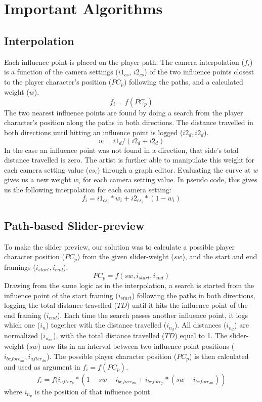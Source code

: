\section{Important Algorithms}
\subsection{Interpolation}

Each influence point is placed on the player path. The camera interpolation ($f_{i}$) is a function of the camera settings ($i1_{cs}$, $i2_{cs}$) of the two influence points closest to the player character's position ($PC_{p}$) following the paths, and a calculated weight ($w$).
\begin{equation}
f_{i} = f(PC_{p})
\end{equation}
The two nearest influence points are found by doing a search from the player character's position along the paths in both directions. The distance travelled in both directions until hitting an influence point is logged ($i2_{d}, i2_{d}$).
\begin{equation}
w = i1_{d}/(i2_{d} + i2_{d})
\end{equation}
In the case an influence point was not found in a direction, that side's total distance travelled is zero. The artist is further able to manipulate this weight for each camera setting value ($cs_{i}$) through a graph editor. Evaluating the curve at $w$ gives us a new weight $w_{i}$ for each camera setting value. In pseudo code, this gives us the following interpolation for each camera setting:
\begin{equation}
f_{i} = i1_{cs_{i}} * w_{i} + i2_{cs_{i}} * (1-w_{i})
\end{equation}
\subsection{Path-based Slider-preview}
To make the slider preview, our solution was to calculate a possible player character position ($PC_{p}$) from the given slider-weight ($sw$), and the start and end framings ($i_{start}, i_{end}$).
\begin{equation}
PC_{p} = f(sw, i_{start}, i_{end})
\end{equation}
Drawing from the same logic as in the interpolation, a search is started from the influence point of the start framing ($i_{start}$) following the paths in both directions, logging the total distance travelled ($TD$) until it hits the influence point of the end framing ($i_{end}$). Each time the search passes another influence point, it logs which one ($i_{n}$) together with the distance travelled ($i_{n_{d}}$). All distances ($i_{n_{d}}$) are normalized ($i_{n_{dn}}$), with the total distance travelled ($TD$) equal to 1. The slider-weight ($sw$) now fits in an interval between two influence point positions ($i_{before_{dn}}, i_{after_{dn}}$). The possible player character position ($PC_{p}$) is then calculated and used as argument in $f_{i} = f(PC_{p})$.
\begin{equation}
f_{i} = f(i_{after_{p}} * (1 - sw - i_{before_{dn}} + i_{before_{p}} * (sw - i_{before_{dn}}))
\end{equation}
where $i_{n_{p}}$ is the position of that influence point.